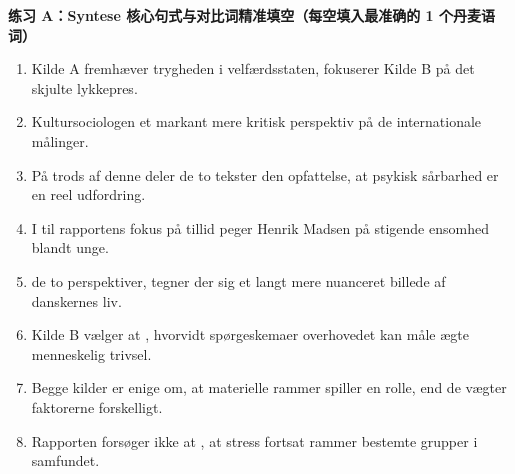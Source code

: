 
\textbf{练习 A：Syntese 核心句式与对比词精准填空（每空填入最准确的 1 个丹麦语词）}
\begin{enumerate}
  \item \underline{\hspace{2.2cm}} Kilde A fremhæver trygheden i velfærdsstaten, fokuserer Kilde B på det skjulte lykkepres.
  \item Kultursociologen \underline{\hspace{2.2cm}} et markant mere kritisk perspektiv på de internationale målinger.
  \item På trods af denne \underline{\hspace{2.2cm}} deler de to tekster den opfattelse, at psykisk sårbarhed er en reel udfordring.
  \item I \underline{\hspace{2.2cm}} til rapportens fokus på tillid peger Henrik Madsen på stigende ensomhed blandt unge.
  \item \underline{\hspace{2.2cm}} de to perspektiver, tegner der sig et langt mere nuanceret billede af danskernes liv.
  \item Kilde B vælger at \underline{\hspace{2.2cm}}, hvorvidt spørgeskemaer overhovedet kan måle ægte menneskelig trivsel.
  \item Begge kilder er enige om, at materielle rammer spiller en rolle, \underline{\hspace{2.2cm}} end de vægter faktorerne forskelligt.
  \item Rapporten forsøger ikke at \underline{\hspace{2.2cm}}, at stress fortsat rammer bestemte grupper i samfundet.
\end{enumerate}

